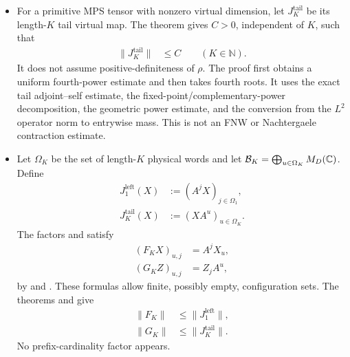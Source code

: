 \documentclass{article}
\begin{document}
\begin{itemize}
    \item For a primitive MPS tensor with nonzero virtual dimension, let
          $J_K^{\mathrm{tail}}$ be its length-$K$ tail virtual map. The theorem
           gives
          $C>0$, independent of $K$, such that
          \begin{align}
              \lVert J_K^{\mathrm{tail}}\rVert
               & \leq C
              \qquad(K\in\mathbb N).
              \label{eq:cpgsv21_martingale_overlap_uniform_tail_virtual_norm}
          \end{align}
          It does not assume positive-definiteness of $\rho$. The proof first obtains
          a uniform fourth-power estimate and then takes fourth roots. It uses the
          exact tail adjoint--self estimate, the fixed-point/complementary-power
          decomposition, the geometric power estimate, and the conversion from the
          $L^2$ operator norm to entrywise mass. This is not an FNW or Nachtergaele
          contraction estimate.

    \item Let $\Omega_K$ be the set of length-$K$ physical words and let
          $\mathcal B_K=\bigoplus_{u\in\Omega_K}M_{D}(\mathbb{C})$. Define
          \begin{align}
              J_1^{\mathrm{left}}(X)
               & :=(A^jX)_{j\in\Omega_1},
              \label{eq:cpgsv21_martingale_overlap_one_site_left_virtual_map} \\
              J_K^{\mathrm{tail}}(X)
               & :=(XA^u)_{u\in\Omega_K}.
              \label{eq:cpgsv21_martingale_overlap_k_site_tail_virtual_map}
          \end{align}
          The factors  and
           satisfy
          \begin{align}
              (F_KX)_{u,j}
               & =A^jX_u,
              \label{eq:cpgsv21_martingale_overlap_c3_left_overlap_factor} \\
              (G_KZ)_{u,j}
               & =Z_jA^u,
              \label{eq:cpgsv21_martingale_overlap_c3_right_overlap_factor}
          \end{align}
          by
           and
          .
          These formulas allow finite, possibly empty, configuration sets. The
          theorems  and
           give
          \begin{align}
              \lVert F_K\rVert
               & \leq\lVert J_1^{\mathrm{left}}\rVert,
              \label{eq:cpgsv21_martingale_overlap_c3_left_factor_norm} \\
              \lVert G_K\rVert
               & \leq\lVert J_K^{\mathrm{tail}}\rVert.
              \label{eq:cpgsv21_martingale_overlap_c3_right_factor_norm}
          \end{align}
          No prefix-cardinality factor appears.


\end{itemize}
\end{document}
